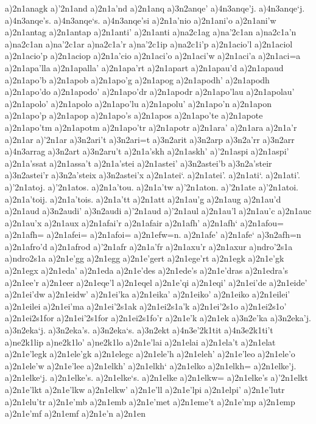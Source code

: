 {a)2n1anagk
a)'2n1and
a)2n1a'nd
a)2n1anq
a)3n2anqe'
a)4n3anqe'j.
a)4n3anqe`j.
a)4n3anqe's.
a)4n3anqe`s.
a)4n3anqe'si
a)2n1a'nio
a)2n1ani'o
a)2n1ani'w
a)2n1antag
a)2n1antap
a)2n1anti'
a)2n1anti
a)na2c1ag
a)na'2c1an
a)na2c1a'n
a)na2c1an
a)na'2c1ar
a)na2c1a'r
a)na'2c1ip
a)na2c1i'p
a)2n1acio'l
a)2n1aciol
a)2n1acio'p
a)2n1aciop
a)2n1a'cio
a)2n1aci'o
a)2n1aci'w
a)2n1aci'a
a)2n1aci=a
a)2n1apa'lla
a)2n1apalla'
a)2n1apa'rt
a)2n1apart
a)2n1apau'd
a)2n1apaud
a)2n1apo'b
a)2n1apob
a)2n1apo'g
a)2n1apog
a)2n1apodh'
a)2n1apodh
a)2n1apo'do
a)2n1apodo'
a)2n1apo'dr
a)2n1apodr
a)2n1apo'lau
a)2n1apolau'
a)2n1apolo'
a)2n1apolo
a)2n1apo'lu
a)2n1apolu'
a)2n1apo'n
a)2n1apon
a)2n1apo'p
a)2n1apop
a)2n1apo's
a)2n1apos
a)2n1apo'te
a)2n1apote
a)2n1apo'tm
a)2n1apotm
a)2n1apo'tr
a)2n1apotr
a)2n1ara'
a)2n1ara
a)2n1a'r
a)2n1ar
a)'2n1ar
a)3n2ari't
a)3n2ari=t
a)3n2arit
a)3n2arp
a)3n2a'rr
a)3n2arr
a)4n3arrag
a)3n2art
a)3n2aru't
a)2n1a'skh
a)2n1askh'
a)'2n1aspi
a)2n1aspi'
a)2n1a'ssat
a)2n1assa't
a)2n1a'stei
a)2n1astei'
a)3n2astei'b
a)3n2a'steir
a)3n2astei'r
a)3n2a'steix
a)3n2astei'x
a)2n1atei`.
a)2n1atei'.
a)2n1ati`.
a)2n1ati'.
a)'2n1atoj.
a)'2n1atos.
a)2n1a'tou.
a)2n1a'tw
a)'2n1aton.
a)'2n1ate
a)'2n1atoi.
a)2n1a'toij.
a)2n1a'tois.
a)2n1a'tt
a)2n1att
a)2n1au'g
a)2n1aug
a)2n1au'd
a)2n1aud
a)3n2audi'
a)3n2audi
a)'2n1aud
a)'2n1aul
a)2n1au'l
a)2n1au'c
a)2n1auc
a)2n1au'x
a)2n1aux
a)2n1afai'r
a)2n1afair
a)2n1afh'
a)2n1afh`
a)2n1afou=
a)2n1afh=
a)2n1afei=
a)2n1afoi=
a)2n1efw=n.
a)2n1afe'
a)2n1afe`
a)3n2afh=n
a)2n1afro'd
a)2n1afrod
a)'2n1afr
a)2n1a'fr
a)2n1axu'r
a)2n1axur
a)ndro'2s1a
a)ndro2s1a
a)2n1e'gg
a)2n1egg
a)2n1e'gert
a)2n1ege'rt
a)2n1egk
a)2n1e'gk
a)2n1egx
a)2n1eda'
a)2n1eda
a)2n1e'des
a)2n1ede's
a)2n1e'dras
a)2n1edra's
a)2n1ee'r
a)2n1eer
a)2n1eqe'l
a)2n1eqel
a)2n1e'qi
a)2n1eqi'
a)2n1ei'de
a)2n1eide'
a)2n1ei'dw
a)2n1eidw'
a)2n1ei'ka
a)2n1eika'
a)2n1eiko'
a)2n1eiko
a)2n1eilei'
a)2n1eilei
a)2n1ei'ma
a)2n1ei'2s1ak
a)2n1ei2s1a'k
a)2n1ei'2s1o
a)2n1ei2s1o'
a)2n1ei2s1for
a)2n1ei'2s1for
a)2n1ei2s1fo'r
a)2n1e'k
a)2n1ek
a)3n2e'ka
a)3n2eka'j.
a)3n2eka`j.
a)3n2eka's.
a)3n2eka`s.
a)3n2ekt
a)4n3e'2k1tit
a)4n3e2k1ti't
a)ne2k1lip
a)ne2k1lo'
a)ne2k1lo
a)2n1e'lai
a)2n1elai
a)2n1ela't
a)2n1elat
a)2n1e'legk
a)2n1ele'gk
a)2n1elegc
a)2n1ele'h
a)2n1eleh'
a)2n1e'leo
a)2n1ele'o
a)2n1ele'w
a)2n1e'lee
a)2n1elkh'
a)2n1elkh`
a)2n1elko
a)2n1elkh=
a)2n1elke'j.
a)2n1elke`j.
a)2n1elke's.
a)2n1elke`s.
a)2n1elke
a)2n1elkw=
a)2n1elke's
a)'2n1elkt
a)2n1e'lkt
a)2n1e'lkw
a)2n1elkw'
a)2n1e'll
a)2n1e'lpi
a)2n1elpi'
a)2n1e'lutr
a)2n1elu'tr
a)2n1e'mb
a)2n1emb
a)2n1e'met
a)2n1eme't
a)2n1e'mp
a)2n1emp
a)2n1e'mf
a)2n1emf
a)2n1e'n
a)2n1en
}
